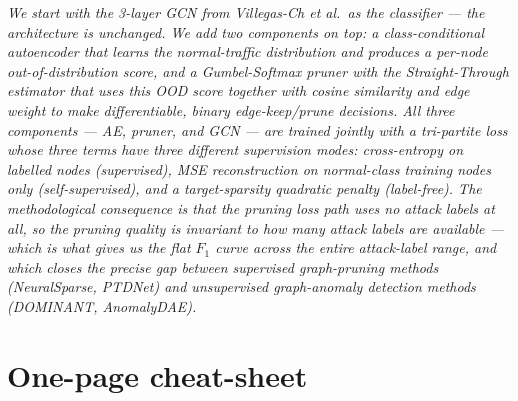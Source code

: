 \documentclass[11pt,a4paper]{article}
\begin{document}
\begin{keybox}
\itshape
We start with the 3-layer GCN from Villegas-Ch et al.\ as the
classifier --- the architecture is unchanged. We add two components
on top: a class-conditional autoencoder that learns the normal-traffic
distribution and produces a per-node out-of-distribution score, and a
Gumbel-Softmax pruner with the Straight-Through estimator that uses
this OOD score together with cosine similarity and edge weight to
make differentiable, binary edge-keep/prune decisions. All three
components --- AE, pruner, and GCN --- are trained jointly with a
tri-partite loss whose three terms have three different supervision
modes: cross-entropy on labelled nodes (supervised),
MSE reconstruction on normal-class training nodes only
(self-supervised), and a target-sparsity quadratic penalty
(label-free). The methodological consequence is that the pruning
loss path uses no attack labels at all, so the pruning quality is
invariant to how many attack labels are available --- which is what
gives us the flat $F_1$ curve across the entire attack-label range,
and which closes the precise gap between supervised graph-pruning
methods (NeuralSparse, PTDNet) and unsupervised graph-anomaly
detection methods (DOMINANT, AnomalyDAE).
\end{keybox}

\section{One-page cheat-sheet}
\end{document}
